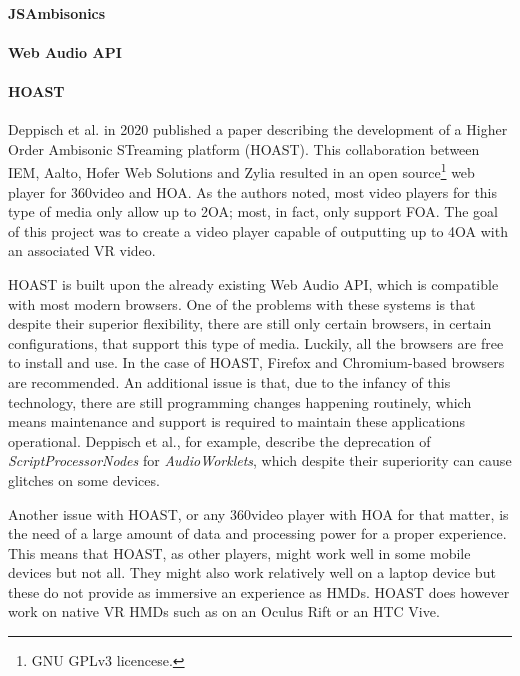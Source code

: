 \paragraph{JSAmbisonics}

\paragraph{Web Audio API}

\paragraph{HOAST}

Deppisch et al. \cite{deppisch2020hoast} in 2020 published a paper describing the development of a Higher Order Ambisonic STreaming platform (HOAST). This collaboration between IEM, Aalto, Hofer Web Solutions and Zylia resulted in an open source\footnote{GNU GPLv3 licencese.} web player for 360\textdegree video and HOA. As the authors noted, most video players for this type of media only allow up to 2OA; most, in fact, only support FOA. The goal of this project was to create a video player capable of outputting up to 4OA with an associated VR video. 

HOAST is built upon the already existing Web Audio API, which is compatible with most modern browsers. One of the problems with these systems is that despite their superior flexibility, there are still only certain browsers, in certain configurations, that support this type of media. Luckily, all the browsers are free to install and use. In the case of HOAST, Firefox and Chromium-based browsers are recommended. An additional issue is that, due to the infancy of this technology, there are still programming changes happening routinely, which means maintenance and support is required to maintain these applications operational. Deppisch et al., for example, describe the deprecation of \textit{ScriptProcessorNodes} for \textit{AudioWorklets}, which despite their superiority can cause glitches on some devices. 

Another issue with HOAST, or any 360\textdegree video player with HOA for that matter, is the need of a large amount of data and processing power for a proper experience. This means that HOAST, as other players, might work well in some mobile devices but not all. They might also work relatively well on a laptop device but these do not provide as immersive an experience as HMDs. HOAST does however work on native VR HMDs such as on an Oculus Rift or an HTC Vive. 

